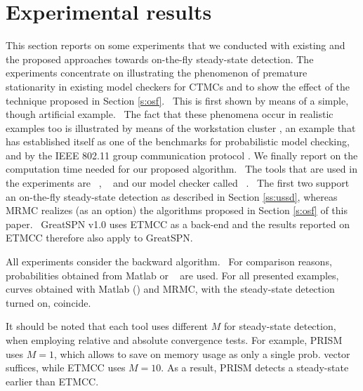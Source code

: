 \documentclass{entcs}
\newcommand{\Section}[1]{\section{#1}}
\begin{document}
\Section{Experimental results \label{s:examples}}

	This section reports on some experiments that we conducted with existing and the proposed approaches towards on-the-fly steady-state detection. The experiments concentrate on illustrating the phenomenon of premature stationarity in existing model checkers for CTMCs and to show the effect of the technique proposed in Section \ref{s:osf}.  This is first shown by means of a simple, though artificial example.  The fact that these phenomena occur in realistic examples too is illustrated by means of the workstation cluster \cite{HaverkortHK_SRDS00,BuchholzKKT_JLAP03,YounesKNP_TACAS04,KwiatkowskaNP_IMTTCPE02,Prism_WC05}, an example that has established itself as one of the benchmarks for probabilistic model checking, and by the IEEE 802.11 group communication protocol \cite{MassinkKL_DSN04}. We finally report on the computation time needed for our proposed algorithm.  The tools that are used in the experiments are \prism ~\cite{KwiatkowskaNP_QEST04}, \etmcc ~\cite{HermansKMS_IJSTTT03} and our model checker called \mrmc ~\cite{KatoenKZ_QEST05}.  The first two support an on-the-fly steady-state detection as described in Section \ref{ss:ussd}, whereas MRMC realizes (as an option) the algorithms proposed in Section \ref{s:osf} of this paper.  GreatSPN v1.0 \cite{DAprileDS_DS04} uses ETMCC as a back-end and the results reported on ETMCC therefore also apply to GreatSPN.

	All experiments consider the backward algorithm.  For comparison reasons, probabilities obtained from Matlab or \ultrasan~\cite{SandersOQW_PECS95} are used. For all presented examples, curves obtained with Matlab (\ultrasan) and MRMC, with the steady-state detection turned on, coincide.

	It should be noted that each tool uses different $M$ for steady-state detection, when employing relative and absolute convergence tests. For example, PRISM uses $M=1$, which allows to save on memory usage as only a single prob. vector suffices, while ETMCC uses $M=10$. As a result, PRISM detects a steady-state earlier than ETMCC.
	
\end{document}
